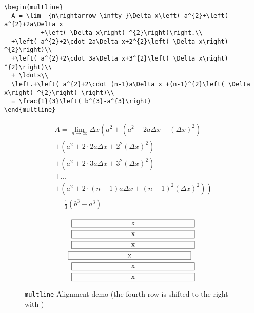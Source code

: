 \begin{table}[htb]
\begin{lstlisting}[xleftmargin=-1cm,xrightmargin=-1.5cm]
\begin{multline}
  A = \lim _{n\rightarrow \infty }\Delta x\left( a^{2}+\left( a^{2}+2a\Delta x
          +\left( \Delta x\right) ^{2}\right)\right.\\
  +\left( a^{2}+2\cdot 2a\Delta x+2^{2}\left( \Delta x\right) ^{2}\right)\\
  +\left( a^{2}+2\cdot 3a\Delta x+3^{2}\left( \Delta x\right) ^{2}\right)\\
  + \ldots\\
  \left.+\left( a^{2}+2\cdot (n-1)a\Delta x +(n-1)^{2}\left( \Delta x\right) ^{2}\right) \right)\\
  = \frac{1}{3}\left( b^{3}-a^{3}\right)
\end{multline}
\end{lstlisting}
\begin{multline}
A=\lim_{n\rightarrow\infty}\Delta x\left(a^{2}+\left(a^{2}+2a\Delta x+\left(\Delta x\right)^{2}\right)\right.\label{eq:reset}\\
+\left(a^{2}+2\cdot2a\Delta x+2^{2}\left(\Delta x\right)^{2}\right)\\
+\left(a^{2}+2\cdot3a\Delta x+3^{2}\left(\Delta x\right)^{2}\right)\\
+\ldots\\
\left.+\left(a^{2}+2\cdot(n-1)a\Delta x+(n-1)^{2}\left(\Delta x\right)^{2}\right)\right)\\
=\frac{1}{3}\left(b^{3}-a^{3}\right)
\end{multline}


\begin{figure}[htb]
\begin{multline}
\framebox[0.5\columnwidth]{x}\\
\framebox[0.5\columnwidth]{x}\\
\framebox[0.5\columnwidth]{x}\\
\shoveright{\framebox[0.5\columnwidth]{x}}\\
\framebox[0.5\columnwidth]{x}\\
\framebox[0.5\columnwidth]{x}
\end{multline}
\caption{\texttt{multline} Alignment demo
(the fourth row is shifted to the right with )}
\label{cap:multline-Alignment-Demo}
\end{figure}


\end{table}
